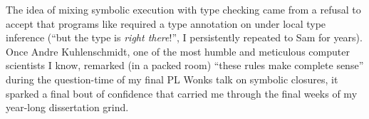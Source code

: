 The idea of mixing symbolic execution with type checking came from a refusal
to accept that programs like  required a type annotation
on  under local type inference
(``but the type is \emph{right there}!'', I persistently repeated to Sam for years).
Once Andre Kuhlenschmidt, one of the most humble and meticulous computer scientists
I know, remarked (in a packed room) ``these rules make complete sense'' 
during the question-time of my final PL Wonks talk on symbolic closures,
it sparked a final bout of confidence that carried
me through the final weeks of my year-long dissertation grind.

